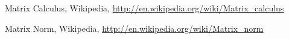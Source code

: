 	Matrix Calculus, Wikipedia, 
	\url{http://en.wikipedia.org/wiki/Matrix_calculus}
	
	Matrix Norm, Wikipedia, 
	\url{http://en.wikipedia.org/wiki/Matrix_norm}